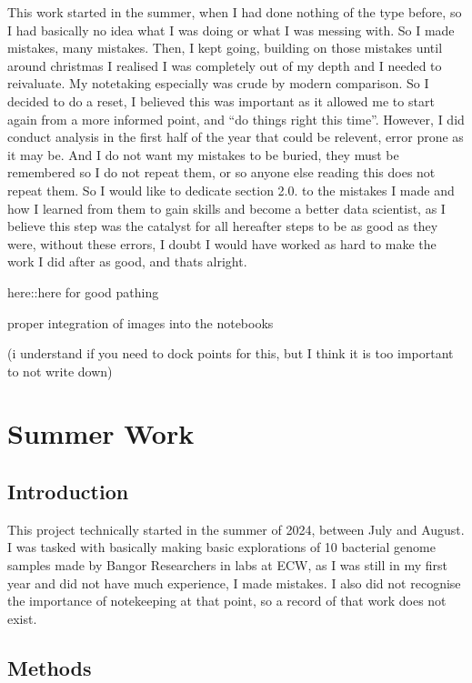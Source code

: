 \documentclass[
  letterpaper,
  DIV=11,
  numbers=noendperiod]{scrreprt}
\begin{document}
This work started in the summer, when I had done nothing of the type
before, so I had basically no idea what I was doing or what I was
messing with. So I made mistakes, many mistakes. Then, I kept going,
building on those mistakes until around christmas I realised I was
completely out of my depth and I needed to reivaluate. My notetaking
especially was crude by modern comparison. So I decided to do a reset, I
believed this was important as it allowed me to start again from a more
informed point, and ``do things right this time''. However, I did
conduct analysis in the first half of the year that could be relevent,
error prone as it may be. And I do not want my mistakes to be buried,
they must be remembered so I do not repeat them, or so anyone else
reading this does not repeat them. So I would like to dedicate section
2.0. to the mistakes I made and how I learned from them to gain skills
and become a better data scientist, as I believe this step was the
catalyst for all hereafter steps to be as good as they were, without
these errors, I doubt I would have worked as hard to make the work I did
after as good, and thats alright.

here::here for good pathing

proper integration of images into the notebooks

(i understand if you need to dock points for this, but I think it is too
important to not write down)


\chapter{Summer Work}\label{summer-work}

\section{Introduction}\label{introduction-1}

This project technically started in the summer of 2024, between July and
August. I was tasked with basically making basic explorations of 10
bacterial genome samples made by Bangor Researchers in labs at ECW, as I
was still in my first year and did not have much experience, I made
mistakes. I also did not recognise the importance of notekeeping at that
point, so a record of that work does not exist.

\section{Methods}\label{methods}
\end{document}
